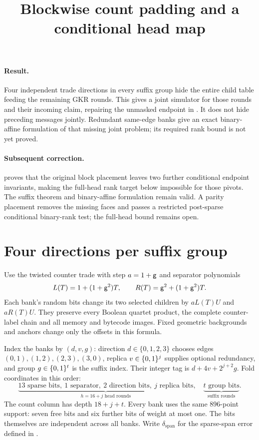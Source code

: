 \documentclass[11pt]{article}
\title{Blockwise count padding and a conditional head map}
\author{}
\date{}
\begin{document}
\maketitle
\vspace{-2em}

\paragraph{Result.} Four independent trade directions in every suffix group hide the entire child table feeding the remaining GKR rounds. This gives a joint simulator for those rounds and their incoming claim, repairing the unmasked endpoint in . It does not hide preceding messages jointly. Redundant same-edge banks give an exact binary-affine formulation of that missing joint problem; its required rank bound is not yet proved.

\paragraph{Subsequent correction.}  proves that the original block placement leaves two further conditional endpoint invariants, making the full-head rank target below impossible for those pivots. The suffix theorem and binary-affine formulation remain valid. A parity placement removes the missing faces and passes a restricted post-sparse conditional binary-rank test; the full-head bound remains open.

\section{Four directions per suffix group}

Use the twisted counter trade with step $a=1+\mathsf{g}$ and separator polynomials
\[
 L(T)=1+(1+\mathsf{g}^2)T,\qquad R(T)=\mathsf{g}^2+(1+\mathsf{g}^2)T.
\]
Each bank's random bits change its two selected children by $aL(T)U$ and $aR(T)U$. They preserve every Boolean quartet product, the complete counter-label chain and all memory and bytecode images. Fixed geometric backgrounds and anchors change only the offsets in this formula.

Index the banks by $(d,v,g)$: direction $d\in\{0,1,2,3\}$ chooses edges $(0,1),(1,2),(2,3),(3,0)$, replica $v\in\{0,1\}^{j}$ supplies optional redundancy, and group $g\in\{0,1\}^{t}$ is the suffix index. Their integer tag is $d+4v+2^{j+2}g$. Fold coordinates in this order:
\[
 \underbrace{13\text{ sparse bits},\ 1\text{ separator},\ 2\text{ direction bits},\ j\text{ replica bits}}_{h=16+j\text{ head rounds}},\quad
 \underbrace{t\text{ group bits}}_{\text{suffix rounds}}.
\]
The count column has depth $18+j+t$. Every bank uses the same $896$-point support: seven free bits and six further bits of weight at most one. The bits themselves are independent across all banks. Write $\delta_{\mathrm{span}}$ for the sparse-span error defined in .
\end{document}
